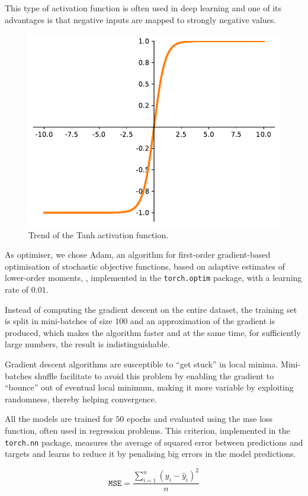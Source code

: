 This type of activation function is often used in deep learning and one of its 
advantages is that negative inputs are mapped to strongly negative values.

\begin{figure}[!htb]
	\centering
	\includegraphics[width=.5\textwidth]{contents/images/tanh2}%
	\caption{Trend of the Tanh activation function.}
	\label{fig:tanh}
\end{figure}

As optimiser, we chose Adam, {an algorithm for first-order gradient-based 
optimisation of stochastic objective functions, based on adaptive estimates of 
lower-order moments}, \cite[see][]{kingma2014adam, 
loshchilov2017decoupled}, 
implemented in the \texttt{torch.optim} package, with a learning rate of $0.01$. 

Instead of computing the gradient descent on the entire dataset, the training set is 
split in mini-batches of size $100$ and an approximation of the gradient is 
produced, which makes the algorithm faster and at the same time, for sufficiently 
large numbers, the result is indistinguishable.

Gradient descent algorithms are susceptible to ``get stuck'' in local minima.
Mini-batches shuffle facilitate to avoid this problem by enabling the gradient to 
``bounce'' out of eventual local minimum, making it more variable by exploiting 
randomness, thereby helping convergence.

All the models are trained for $50$ epochs and evaluated using the \gls{mse} loss 
function, often used in regression problems. 
This criterion, implemented in the \texttt{torch.nn} package, measures the 
average of squared error between predictions and targets and learns to reduce it 
by penalising big errors in the model predictions.

\begin{Equation}[!htb]
	\centering
	\begin{equation}
	\mathtt{MSE} = \frac{\sum_{i=1}^n (y_i-\hat y_i)^2}{n}
	\end{equation}
	\caption{Mean Squared Error (\gls{mse}) loss function.}
	\label{eq:mse}
\end{Equation}
	

